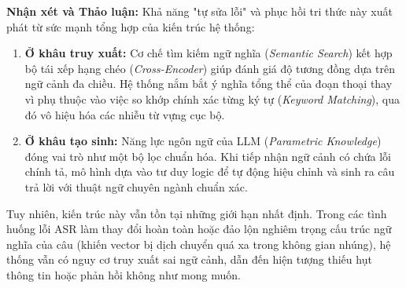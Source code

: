 \textbf{Nhận xét và Thảo luận:}
Khả năng "tự sửa lỗi" và phục hồi tri thức này xuất phát từ sức mạnh tổng hợp của kiến trúc hệ thống:
\begin{enumerate}
    \item \textbf{Ở khâu truy xuất:} Cơ chế tìm kiếm ngữ nghĩa (\textit{Semantic Search}) kết hợp bộ tái xếp hạng chéo (\textit{Cross-Encoder}) giúp đánh giá độ tương đồng dựa trên ngữ cảnh đa chiều. Hệ thống nắm bắt ý nghĩa tổng thể của đoạn thoại thay vì phụ thuộc vào việc so khớp chính xác từng ký tự (\textit{Keyword Matching}), qua đó vô hiệu hóa các nhiễu từ vựng cục bộ.
    \item \textbf{Ở khâu tạo sinh:} Năng lực ngôn ngữ của LLM (\textit{Parametric Knowledge}) đóng vai trò như một bộ lọc chuẩn hóa. Khi tiếp nhận ngữ cảnh có chứa lỗi chính tả, mô hình dựa vào tư duy logic để tự động hiệu chỉnh và sinh ra câu trả lời với thuật ngữ chuyên ngành chuẩn xác.
\end{enumerate}

Tuy nhiên, kiến trúc này vẫn tồn tại những giới hạn nhất định. Trong các tình huống lỗi ASR làm thay đổi hoàn toàn hoặc đảo lộn nghiêm trọng cấu trúc ngữ nghĩa của câu (khiến vector bị dịch chuyển quá xa trong không gian nhúng), hệ thống vẫn có nguy cơ truy xuất sai ngữ cảnh, dẫn đến hiện tượng thiếu hụt thông tin hoặc phản hồi không như mong muốn.